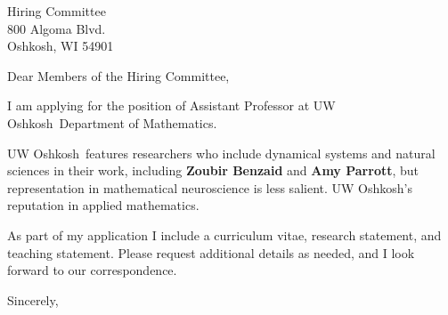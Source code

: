 \documentclass[11pt,a4paper]{letter}
\begin{document}
\def\School{UW Oshkosh}
\begin{letter}
{Hiring Committee\\
800 Algoma Blvd.\\
Oshkosh, WI 54901}


\opening{Dear Members of the Hiring Committee,}

I am applying for the position of Assistant Professor at \School~Department of Mathematics. 



\School~features researchers who include dynamical systems and natural sciences in their work, including \textbf{Zoubir Benzaid} and \textbf{Amy Parrott}, but representation in mathematical neuroscience is less salient. \School's reputation in applied mathematics.



As part of my application I include a curriculum vitae, research statement, and teaching statement. Please request additional details as needed, and I look forward to our correspondence.

\closing{Sincerely,}
\end{letter}
\end{document}
